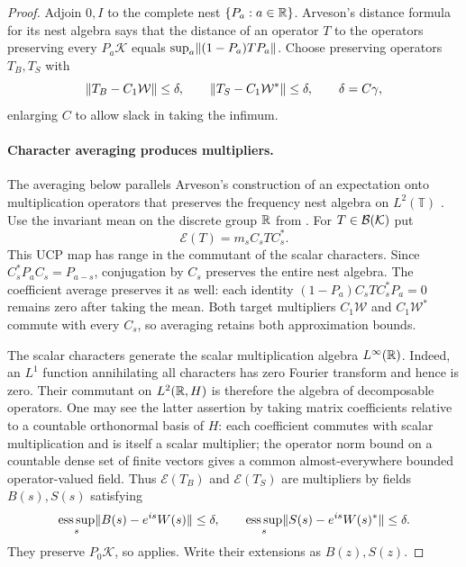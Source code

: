 \begin{proof}
Adjoin $0,I$ to the complete nest $\{P_a:a\in\mathbb R\}$.
Arveson's distance formula for its nest algebra
\cite[Theorem~1.1, p.~212]{Arveson1975} says that the distance of an
operator $T$ to the operators preserving every $P_a\mathcal K$ equals
$\sup_a\lVert(1-P_a)TP_a\rVert$.  Choose preserving operators $T_B,T_S$ with
\[
 \lVert T_B-C_1\mathcal W\rVert\leq\delta,
 \qquad\lVert T_S-C_1\mathcal W^*\rVert\leq\delta,
 \qquad \delta=C\gamma,
\]
enlarging $C$ to allow slack in taking the infimum.

\paragraph{Character averaging produces multipliers.}
The averaging below parallels Arveson's construction of an expectation
onto multiplication operators that preserves the frequency nest algebra
on $L^2(\mathbb T)$ \cite[Proposition~5.1, pp.~228--229]{Arveson1975}.
Use the invariant mean on the discrete group $\mathbb R$ from
. For $T\in\mathcal B(\mathcal K)$ put
\[
 \mathcal E(T)=m_s C_sTC_s^*.
\]
This UCP map has range in the commutant of the scalar characters. Since
$C_s^*P_aC_s=P_{a-s}$, conjugation by $C_s$ preserves the entire nest
algebra.  The coefficient average preserves it as well: each identity
$(1-P_a)C_sTC_s^*P_a=0$ remains zero after taking the mean.
Both target multipliers $C_1\mathcal W$ and $C_1\mathcal W^*$ commute
with every $C_s$, so averaging retains both approximation bounds.

The scalar characters generate the scalar multiplication algebra
$L^\infty(\mathbb R)$.  Indeed, an $L^1$ function annihilating all characters
has zero Fourier transform and hence is zero.  Their commutant on
$L^2(\mathbb R,H)$ is therefore the algebra of decomposable operators.  One
may see the latter assertion by taking matrix coefficients relative
to a countable orthonormal basis of $H$: each coefficient commutes with
scalar multiplication and is itself a scalar multiplier; the operator
norm bound on a countable dense set of finite vectors gives a common
almost-everywhere bounded operator-valued field.  Thus
$\mathcal E(T_B)$ and $\mathcal E(T_S)$ are multipliers by fields
$B(s),S(s)$ satisfying
\begin{equation}\label{eq:B-S-boundary-errors}
 \mathop{\rm ess\,sup}_s\lVert B(s)-e^{is}W(s)\rVert\leq\delta,
 \qquad
 \mathop{\rm ess\,sup}_s\lVert S(s)-e^{is}W(s)^*\rVert\leq\delta.
\end{equation}
They preserve $P_0\mathcal K$, so  applies.
Write their extensions as $B(z),S(z)$.


\end{proof}
